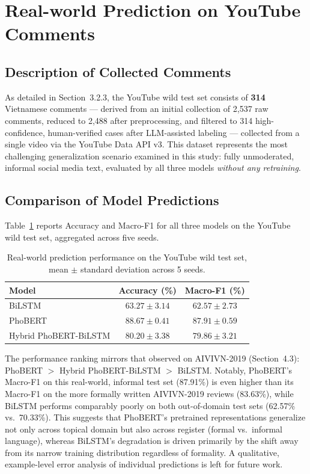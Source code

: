 \documentclass[12pt]{report} %
\begin{document}
\section{Real-world Prediction on YouTube Comments}

\subsection{Description of Collected Comments}
As detailed in Section~3.2.3, the YouTube wild test set consists of \textbf{314} Vietnamese comments --- derived from an initial collection of 2,537 raw comments, reduced to 2,488 after preprocessing, and filtered to 314 high-confidence, human-verified cases after LLM-assisted labeling --- collected from a single video via the YouTube Data API v3. This dataset represents the most challenging generalization scenario examined in this study: fully unmoderated, informal social media text, evaluated by all three models \textit{without any retraining}.

\subsection{Comparison of Model Predictions}
Table~\ref{tab:youtube-results} reports Accuracy and Macro-F1 for all three models on the YouTube wild test set, aggregated across five seeds.

\begin{table}[htbp]
    \centering
    \caption{Real-world prediction performance on the YouTube wild test set, mean $\pm$ standard deviation across 5 seeds.}
    \label{tab:youtube-results}
    \begin{tabular}{lcc}
        \hline
        \textbf{Model}        & \textbf{Accuracy (\%)}    & \textbf{Macro-F1 (\%)}    \\
        \hline
        BiLSTM                & $63.27 \pm 3.14$          & $62.57 \pm 2.73$          \\
        PhoBERT               & $\mathbf{88.67 \pm 0.41}$ & $\mathbf{87.91 \pm 0.59}$ \\
        Hybrid PhoBERT-BiLSTM & $80.20 \pm 3.38$          & $79.86 \pm 3.21$          \\
        \hline
    \end{tabular}
\end{table}

The performance ranking mirrors that observed on AIVIVN-2019 (Section~4.3): PhoBERT $>$ Hybrid PhoBERT-BiLSTM $>$ BiLSTM. Notably, PhoBERT's Macro-F1 on this real-world, informal test set (87.91\%) is even higher than its Macro-F1 on the more formally written AIVIVN-2019 reviews (83.63\%), while BiLSTM performs comparably poorly on both out-of-domain test sets (62.57\% vs.\ 70.33\%). This suggests that PhoBERT's pretrained representations generalize not only across topical domain but also across register (formal vs.\ informal language), whereas BiLSTM's degradation is driven primarily by the shift away from its narrow training distribution regardless of formality. A qualitative, example-level error analysis of individual predictions is left for future work.
\end{document}
